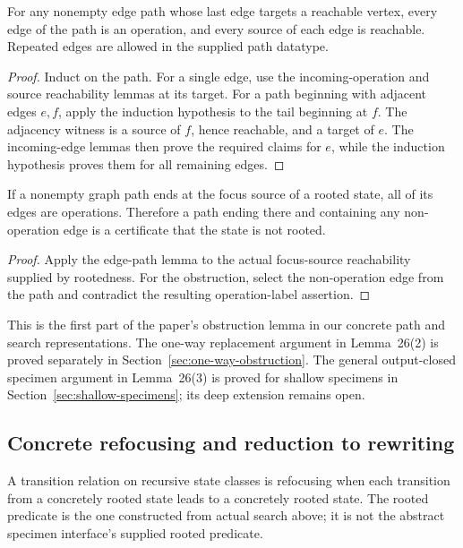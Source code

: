 \begin{lemma}
For any nonempty edge path whose last edge targets a reachable vertex,
every edge of the path is an operation, and every source of each edge is
reachable. Repeated edges are allowed in the supplied path datatype.
\end{lemma}
\begin{proof}
Induct on the path. For a single edge, use the incoming-operation and source
reachability lemmas at its target. For a path beginning with adjacent edges
$e,f$, apply the induction hypothesis to the tail beginning at $f$. The
adjacency witness is a source of $f$, hence reachable, and a target of $e$.
The incoming-edge lemmas then prove the required claims for $e$, while the
induction hypothesis proves them for all remaining edges.
\end{proof}

\begin{theorem}
If a nonempty graph path ends at the focus source of a rooted state, all of
its edges are operations. Therefore a path ending there and containing any
non-operation edge is a certificate that the state is not rooted.
\end{theorem}
\begin{proof}
Apply the edge-path lemma to the actual focus-source reachability supplied
by rootedness. For the obstruction, select the non-operation edge from the
path and contradict the resulting operation-label assertion.
\end{proof}
This is the first part of the paper's obstruction lemma in our concrete path
and search representations. The one-way replacement argument in Lemma~26(2)
is proved separately in Section~\ref{sec:one-way-obstruction}. The general
output-closed specimen argument in Lemma~26(3) is proved for shallow
specimens in Section~\ref{sec:shallow-specimens}; its deep extension remains open.

\subsection{Concrete refocusing and reduction to rewriting}
\begin{definition}
A transition relation on recursive state classes is refocusing when each
transition from a concretely rooted state leads to a concretely rooted state.
The rooted predicate is the one constructed from actual search above; it is
not the abstract specimen interface's supplied rooted predicate.
\end{definition}

